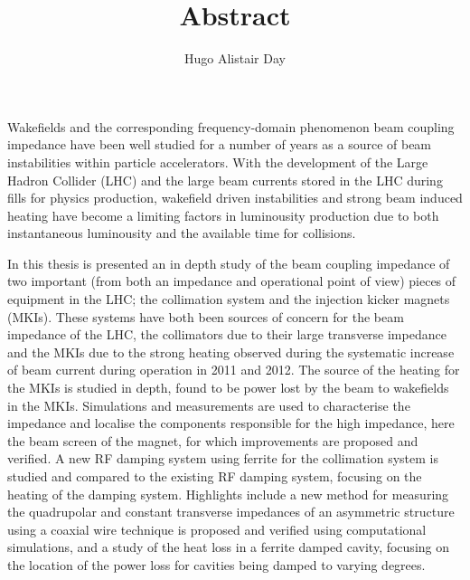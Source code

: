 \documentclass[12pt]{article} %
\title{Abstract}
\author{Hugo Alistair Day}
\begin{document}
\maketitle
Wakefields and the corresponding frequency-domain phenomenon beam coupling impedance have been well studied for a number of years as a source of beam instabilities within particle accelerators. With the development of the Large Hadron Collider (LHC) and the large beam currents stored in the LHC during fills for physics production, wakefield driven instabilities and strong beam induced heating have become a limiting factors in luminousity production due to both instantaneous luminousity and the available time for collisions.

In this thesis is presented an in depth study of the beam coupling impedance of two important (from both an impedance and operational point of view) pieces of equipment in the LHC; the collimation system and the injection kicker magnets (MKIs). These systems have both been sources of concern for the beam impedance of the LHC, the collimators due to their large transverse impedance and the MKIs due to the strong heating observed during the systematic increase of beam current during operation in 2011 and 2012. The source of the heating for the MKIs is studied in depth, found to be power lost by the beam to wakefields in the MKIs. Simulations and measurements are used to characterise the impedance and localise the components responsible for the high impedance, here the beam screen of the magnet, for which improvements are proposed and verified. A new RF damping system using ferrite for the collimation system is studied and compared to the existing RF damping system, focusing on the heating of the damping system. Highlights include a new method for measuring the quadrupolar and constant transverse impedances of an asymmetric structure using a coaxial wire technique is proposed and verified using computational simulations, and a study of the heat loss in a ferrite damped cavity, focusing on the location of the power loss for cavities being damped to varying degrees. 
\end{document}
